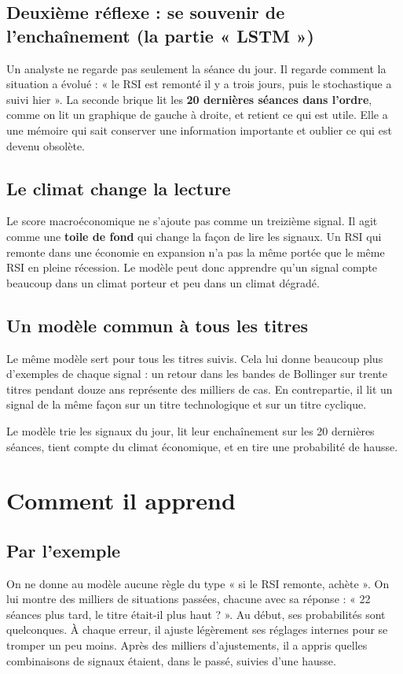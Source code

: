 \documentclass[11pt,a4paper]{article}
\begin{document}
\subsection{Deuxième réflexe : se souvenir de l'enchaînement (la partie « LSTM »)}
Un analyste ne regarde pas seulement la séance du jour. Il regarde comment la situation a
évolué : « le RSI est remonté il y a trois jours, puis le stochastique a suivi hier ». La
seconde brique lit les \textbf{20 dernières séances dans l'ordre}, comme on lit un graphique de
gauche à droite, et retient ce qui est utile. Elle a une mémoire qui sait conserver une
information importante et oublier ce qui est devenu obsolète.

\subsection{Le climat change la lecture}
Le score macroéconomique ne s'ajoute pas comme un treizième signal. Il agit comme une
\textbf{toile de fond} qui change la façon de lire les signaux. Un RSI qui remonte dans une
économie en expansion n'a pas la même portée que le même RSI en pleine récession. Le
modèle peut donc apprendre qu'un signal compte beaucoup dans un climat porteur et peu dans
un climat dégradé.

\subsection{Un modèle commun à tous les titres}
Le même modèle sert pour tous les titres suivis. Cela lui donne beaucoup plus d'exemples
de chaque signal : un retour dans les bandes de Bollinger sur trente titres pendant douze
ans représente des milliers de cas. En contrepartie, il lit un signal de la même façon sur
un titre technologique et sur un titre cyclique.

\begin{resume}
Le modèle trie les signaux du jour, lit leur enchaînement sur les 20 dernières séances,
tient compte du climat économique, et en tire une probabilité de hausse.
\end{resume}

\section{Comment il apprend}
\subsection{Par l'exemple}
On ne donne au modèle aucune règle du type « si le RSI remonte, achète ». On lui montre
des milliers de situations passées, chacune avec sa réponse : « 22 séances plus tard, le
titre était-il plus haut ? ». Au début, ses probabilités sont quelconques. À chaque
erreur, il ajuste légèrement ses réglages internes pour se tromper un peu moins. Après des
milliers d'ajustements, il a appris quelles combinaisons de signaux étaient, dans le passé,
suivies d'une hausse.
\end{document}
